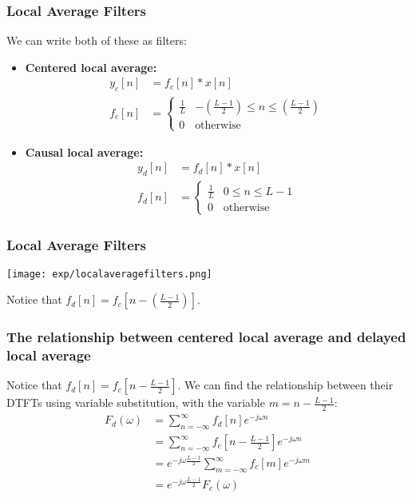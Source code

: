 \documentclass{beamer}
\begin{document}
\begin{frame}
  \frametitle{Local Average Filters}

  We can write both of these as filters:
  \begin{itemize}
  \item {\bf Centered local average:}
    \begin{align*}
      y_c[n] &= f_c[n]\ast x[n]\\
      f_c[n] &= \begin{cases} \frac{1}{L}& -\left(\frac{L-1}{2}\right)\le n\le\left(\frac{L-1}{2}\right)\\
        0&\mbox{otherwise}\end{cases}
    \end{align*}
  \item {\bf Causal local average:}
    \begin{align*}
      y_d[n] &= f_d[n]\ast x[n]\\
      f_d[n] &= \begin{cases} \frac{1}{L}& 0\le n\le L-1\\
        0&\mbox{otherwise}\end{cases}
    \end{align*}
  \end{itemize}
\end{frame}

\begin{frame}
  \frametitle{Local Average Filters}
  \centerline{\texttt{[image: exp/localaveragefilters.png]}}
  Notice that $f_d[n]=f_c\left[n-\left(\frac{L-1}{2}\right)\right]$.
\end{frame}  

\begin{frame}
  \frametitle{The relationship between centered local average and delayed local average}

  Notice that $f_d[n]=f_c[n-\frac{L-1}{2}]$.  We can find the
  relationship between their DTFTs using variable substitution, with
  the variable $m=n-\frac{L-1}{2}$:
  \begin{align*}
    F_d(\omega) &= \sum_{n=-\infty}^\infty f_d[n]e^{-j\omega n}\\
    &=\sum_{n=-\infty}^\infty f_c[n-\frac{L-1}{2}]e^{-j\omega n}\\
    &=e^{-j\omega\frac{L-1}{2}}\sum_{m=-\infty}^\infty f_c[m]e^{-j\omega m}\\
    &=e^{-j\omega\frac{L-1}{2}}F_c(\omega)
  \end{align*}
\end{frame}
  
\end{document}
